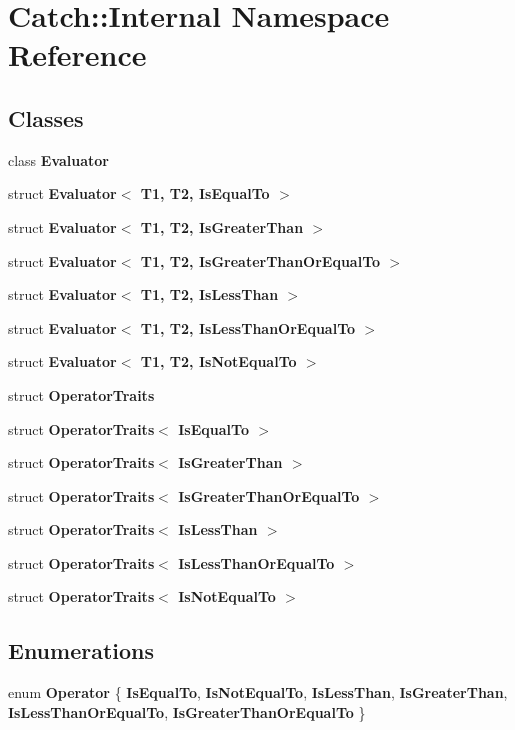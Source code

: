 \section{Catch\+:\+:Internal Namespace Reference}
\label{namespace_catch_1_1_internal}
\subsection*{Classes}
\begin{DoxyCompactItemize}
\item 
class \textbf{ Evaluator}
\item 
struct \textbf{ Evaluator$<$ T1, T2, Is\+Equal\+To $>$}
\item 
struct \textbf{ Evaluator$<$ T1, T2, Is\+Greater\+Than $>$}
\item 
struct \textbf{ Evaluator$<$ T1, T2, Is\+Greater\+Than\+Or\+Equal\+To $>$}
\item 
struct \textbf{ Evaluator$<$ T1, T2, Is\+Less\+Than $>$}
\item 
struct \textbf{ Evaluator$<$ T1, T2, Is\+Less\+Than\+Or\+Equal\+To $>$}
\item 
struct \textbf{ Evaluator$<$ T1, T2, Is\+Not\+Equal\+To $>$}
\item 
struct \textbf{ Operator\+Traits}
\item 
struct \textbf{ Operator\+Traits$<$ Is\+Equal\+To $>$}
\item 
struct \textbf{ Operator\+Traits$<$ Is\+Greater\+Than $>$}
\item 
struct \textbf{ Operator\+Traits$<$ Is\+Greater\+Than\+Or\+Equal\+To $>$}
\item 
struct \textbf{ Operator\+Traits$<$ Is\+Less\+Than $>$}
\item 
struct \textbf{ Operator\+Traits$<$ Is\+Less\+Than\+Or\+Equal\+To $>$}
\item 
struct \textbf{ Operator\+Traits$<$ Is\+Not\+Equal\+To $>$}
\end{DoxyCompactItemize}
\subsection*{Enumerations}
\begin{DoxyCompactItemize}
\item 
enum \textbf{ Operator} \{ \newline
\textbf{ Is\+Equal\+To}, 
\textbf{ Is\+Not\+Equal\+To}, 
\textbf{ Is\+Less\+Than}, 
\textbf{ Is\+Greater\+Than}, 
\newline
\textbf{ Is\+Less\+Than\+Or\+Equal\+To}, 
\textbf{ Is\+Greater\+Than\+Or\+Equal\+To}
 \}
\end{DoxyCompactItemize}

